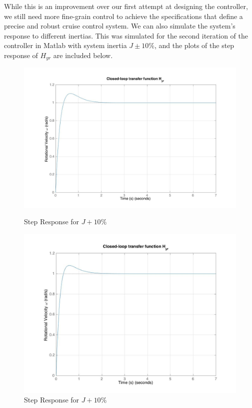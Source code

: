 \documentclass[11pt,titlepage]{article}
\begin{document}
	\noindent While this is an improvement over our first attempt at designing the controller, we still need more fine-grain control to achieve the specifications that define a precise and robust cruise control system. We can also simulate the system's response to different inertias. This was simulated for the second iteration of the controller in Matlab with system inertia $J\pm10\%$, and the plots of the step response of $H_{yr}$ are included below. 
	
	    \begin{figure}[H]
        \centering
        \begin{minipage}{.5\textwidth}
            \centering
            \includegraphics[scale=.18]{Hyr_stepPlus10_mat}
            \caption{Step Response for $J+10\%$}
            \label{fig:Hyr_stepPlus10_mat}
        \end{minipage}%
        \begin{minipage}{.5\textwidth}
            \centering
            \includegraphics[scale=.18]{Hyr_stepMinus10_mat}
            \caption{Step Response for $J+10\%$}
            \label{fig:Hyr_stepMinus10_mat}
        \end{minipage}%
    \end{figure}
	
\end{document}
